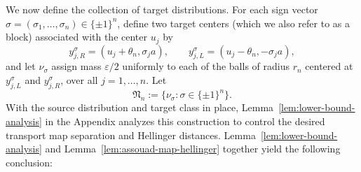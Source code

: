 \documentclass[11pt,twoside]{article}
\newcommand{\targetclass}{\mathfrak{N}}
\begin{document}
We now define the collection of target distributions. For each sign vector $\sigma=(\sigma_1,\ldots,\sigma_n)\in\{\pm1\}^n$,
define two target centers (which we also refer to as a block) associated with the center $u_j$ by
\[
y_{j,R}^{\sigma}=(u_j+\theta_n,\sigma_j a),
\qquad
y_{j,L}^{\sigma}=(u_j-\theta_n,-\sigma_j a),
\]
and let $\nu_\sigma$ assign mass $\varepsilon/2$ uniformly to each of the balls of
radius $r_n$ centered at $y_{j,L}^{\sigma}$ and $y_{j,R}^{\sigma}$, over
all $j=1,\ldots,n$. Let
\[
\targetclass_n:=\{\nu_\sigma:\sigma\in\{\pm1\}^n\}.
\]
With the source distribution and target class in place, Lemma~\ref{lem:lower-bound-analysis} in the Appendix analyzes this construction to control the desired transport map separation and Hellinger distances. Lemma~\ref{lem:lower-bound-analysis} and Lemma~\ref{lem:assouad-map-hellinger} together yield the following conclusion:
\end{document}
